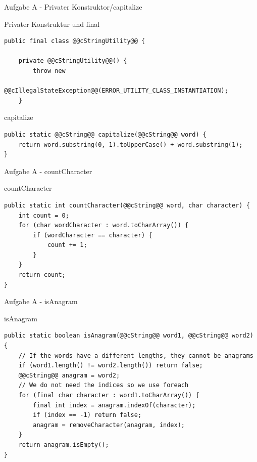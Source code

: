 \documentclass[aspectratio=169]{beamer}
\begin{document}
\begin{frame}[fragile]{Aufgabe A - Privater Konstruktor/capitalize}
  \begin{alertblock}{Privater Konstruktur und \color{keywordcolor}final}
    \begin{lstlisting}
public final class @@cStringUtility@@ {

    private @@cStringUtility@@() {
        throw new
            @@cIllegalStateException@@(ERROR_UTILITY_CLASS_INSTANTIATION);
    }
    \end{lstlisting}
  \end{alertblock}
  \pause
  \begin{block}{capitalize}
    \begin{lstlisting}
public static @@cString@@ capitalize(@@cString@@ word) {
    return word.substring(0, 1).toUpperCase() + word.substring(1);
}
    \end{lstlisting}
  \end{block}
\end{frame}

\begin{frame}[fragile]{Aufgabe A - countCharacter}
  \begin{block}{countCharacter}
    \begin{lstlisting}
public static int countCharacter(@@cString@@ word, char character) {
    int count = 0;
    for (char wordCharacter : word.toCharArray()) {
        if (wordCharacter == character) {
            count += 1;
        }
    }
    return count;
}
    \end{lstlisting}
  \end{block}
\end{frame}

\begin{frame}[fragile]{Aufgabe A - isAnagram}
  \begin{block}{isAnagram}
    \begin{lstlisting}
public static boolean isAnagram(@@cString@@ word1, @@cString@@ word2) {
    // If the words have a different lengths, they cannot be anagrams
    if (word1.length() != word2.length()) return false;
    @@cString@@ anagram = word2;
    // We do not need the indices so we use foreach
    for (final char character : word1.toCharArray()) {
        final int index = anagram.indexOf(character);
        if (index == -1) return false;
        anagram = removeCharacter(anagram, index);
    }
    return anagram.isEmpty();
}
    \end{lstlisting}
  \end{block}
\end{frame}
\end{document}
